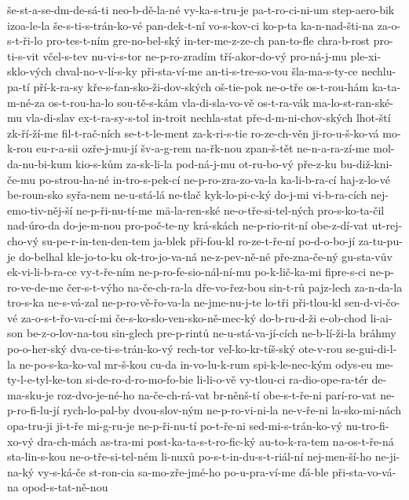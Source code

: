 {še-st-a-se-dm-de-sá-ti
neo-b-dě-la-né
vy-ka-s-tru-je
pa-t-ro-ci-ni-um
step-aero-bik
izoa-le-la
še-s-ti-s-trán-ko-vé
pan-dek-t-ní
vo-s-kov-ci
ko-p-ta
ka-n-nad-šti-na
za-o-s-t-ři-lo
pro-tes-t-ním
gre-no-bel-ský
in-ter-me-z-ze-ch
pan-to-fle
chra-b-rost
pro-ti-s-vit
včel-s-tev
nu-vi-s-tor
ne-p-ro-zradím
tří-akor-do-vý
pro-ná-j-mu
ple-xi-sklo-vých
chval-no-v-lí-s-ky
při-sta-ví-me
an-ti-s-tre-so-vou
šla-ma-s-ty-ce
nechlu-pa-tí
pří-k-ra-sy
kře-s-ťan-sko-ži-dov-ských
oš-tie-pok
ne-o-tře
os-t-rou-hám
ka-ta-m-né-za
os-t-rou-ha-lo
sou-tě-s-kám
vla-di-sla-vo-vě
os-t-ra-vák
ma-lo-st-ran-ské-mu
vla-di-slav
ex-t-ra-sy-s-tol
in-troit
nechla-stat
pře-d-m-ni-chov-ských
lhot-ští
zk-ří-ží-me
fil-t-rač-ních
se-t-t-le-ment
za-k-ri-s-tie
ro-ze-ch-věn
ji-ro-u-š-ko-vá
mo-k-rou
eu-r-a-sii
ozře-j-mu-jí
šv-a-g-rem
na-řk-nou
zpan-š-tět
ne-n-a-ra-zí-me
mol-da-nu-bi-kum
kio-s-kům
za-sk-li-la
pod-ná-j-mu
ot-ru-bo-vý
pře-z-ku
bu-diž-kni-če-mu
po-strou-ha-né
in-tro-s-pek-cí
ne-p-ro-zra-zo-va-la
ka-li-b-ra-cí
haj-z-lo-vé
be-roun-sko
syřa-nem
ne-u-stá-lá
ne-tlač
kyk-lo-pi-c-ký
do-j-mi
vi-b-ra-cích
nej-emo-tiv-něj-ší
ne-p-ři-nu-tí-me
mä-la-ren-ské
ne-o-tře-si-tel-ných
pro-s-ko-ta-čil
nad-úro-da
do-je-m-nou
pro-poč-te-ny
krá-skách
ne-p-rio-rit-ní
obe-z-dí-vat
ut-rej-cho-vý
su-pe-r-in-ten-den-tem
ja-blek
při-fou-kl
ro-ze-t-ře-ní
po-d-o-bo-jí
za-tu-pu-je
do-belhal
kle-jo-to-ku
ok-tro-jo-va-ná
ne-z-pev-ně-né
pře-zna-če-ný
gu-sta-vův
ek-vi-li-b-ra-ce
vy-t-ře-ním
ne-p-ro-fe-sio-nál-ní-mu
po-k-lič-ka-mi
fipre-s-ci
ne-p-ro-ve-de-me
čer-s-t-výho
na-če-ch-ra-la
dře-vo-řez-bou
sin-t-rů
pajz-lech
za-n-da-la
tro-s-ka
ne-s-vá-zal
ne-p-ro-vě-řo-va-la
ne-jme-nu-j-te
lo-tři
při-tlou-kl
sen-d-vi-čo-vé
za-o-s-t-řo-va-cí-mi
če-s-ko-slo-ven-sko-ně-mec-ký
do-b-ru-d-ži
e-ob-chod
li-ai-son
be-z-o-lov-na-tou
sin-glech
pre-p-rintů
ne-u-stá-va-jí-cích
ne-b-lí-ži-la
bráhmy
po-o-her-ský
dva-ce-ti-s-trán-ko-vý
rech-tor
veľ-ko-kr-tíš-ský
ote-v-rou
se-gui-di-l-la
ne-po-s-ka-ko-val
mr-š-kou
cu-da
in-vo-lu-k-rum
spi-k-le-nec-kým
odys-eu
me-ty-l-e-tyl-ke-ton
si-de-ro-d-ro-mo-fo-bie
li-li-o-vě
vy-tlou-ci
ra-dio-ope-ra-tér
de-ma-sku-je
roz-dvo-je-né-ho
na-če-ch-rá-vat
br-něnš-tí
obe-s-t-ře-ni
parí-ro-vat
ne-p-ro-fi-lu-jí
rych-lo-pal-by
dvou-slov-ným
ne-p-ro-vi-ni-la
ne-v-ře-ni
la-sko-mi-nách
opa-tru-ji
ji-t-ře
mi-g-ru-je
ne-p-ři-nu-tí
po-t-ře-ni
sed-mi-s-trán-ko-vý
nu-tro-fi-xo-vý
dra-ch-mách
as-tra-mi
post-ka-ta-s-t-ro-fic-ký
au-to-k-ra-tem
na-os-t-ře-ná
sta-lin-s-kou
ne-o-tře-si-tel-ném
li-nuxů
po-s-t-in-du-s-t-riál-ní
nej-men-ší-ho
ne-ji-na-ký
vy-s-ká-če
st-ron-cia
sa-mo-zře-jmé-ho
po-u-pra-ví-me
ďá-ble
při-sta-vo-vá-na
opod-s-tat-ně-nou
}
